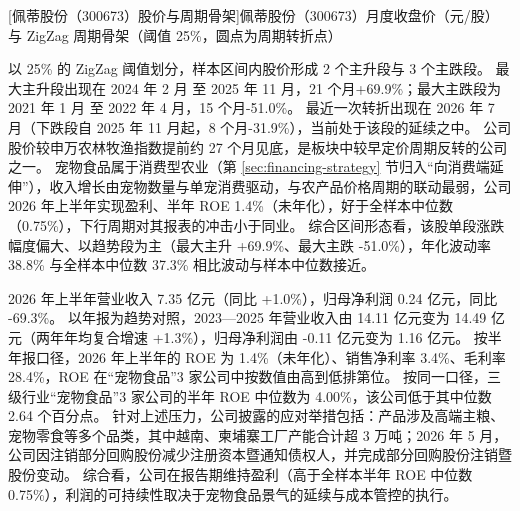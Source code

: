\begin{center}
\begin{minipage}{\textwidth}\centering
{}

[佩蒂股份（300673）股价与周期骨架]{佩蒂股份（300673）月度收盘价（元/股）与 ZigZag 周期骨架（阈值 25\%，圆点为周期转折点）}
\end{minipage}
\end{center}

 以 25\% 的 ZigZag 阈值划分，样本区间内股价形成 2 个主升段与 3 个主跌段。 最大主升段出现在 2024 年 2 月 至 2025 年 11 月，21 个月+69.9\%；最大主跌段为 2021 年 1 月 至 2022 年 4 月，15 个月-51.0\%。 最近一次转折出现在 2026 年 7 月（下跌段自 2025 年 11 月起，8 个月-31.9\%），当前处于该段的延续之中。 公司股价较申万农林牧渔指数提前约 27 个月见底，是板块中较早定价周期反转的公司之一。 宠物食品属于消费型农业（第 \ref{sec:financing-strategy} 节归入“向消费端延伸”），收入增长由宠物数量与单宠消费驱动，与农产品价格周期的联动最弱，公司 2026 年上半年实现盈利、半年 ROE 1.4\%（未年化），好于全样本中位数（0.75\%），下行周期对其报表的冲击小于同业。 综合区间形态看，该股单段涨跌幅度偏大、以趋势段为主（最大主升 +69.9\%、最大主跌 -51.0\%），年化波动率 38.8\% 与全样本中位数 37.3\% 相比波动与样本中位数接近。

 2026 年上半年营业收入 7.35 亿元（同比 +1.0\%），归母净利润 0.24 亿元，同比 -69.3\%。 以年报为趋势对照，2023---2025 年营业收入由 14.11 亿元变为 14.49 亿元（两年年均复合增速 +1.3\%），归母净利润由 -0.11 亿元变为 1.16 亿元。 按半年报口径，2026 年上半年的 ROE 为 1.4\%（未年化）、销售净利率 3.4\%、毛利率 28.4\%，ROE 在“宠物食品”3 家公司中按数值由高到低排第位。 按同一口径，三级行业“宠物食品”3 家公司的半年 ROE 中位数为 4.00\%，该公司低于其中位数 2.64 个百分点。 针对上述压力，公司披露的应对举措包括：产品涉及高端主粮、宠物零食等多个品类，其中越南、柬埔寨工厂产能合计超 3 万吨；2026 年 5 月，公司因注销部分回购股份减少注册资本暨通知债权人，并完成部分回购股份注销暨股份变动。 综合看，公司在报告期维持盈利（高于全样本半年 ROE 中位数 0.75\%），利润的可持续性取决于宠物食品景气的延续与成本管控的执行。

